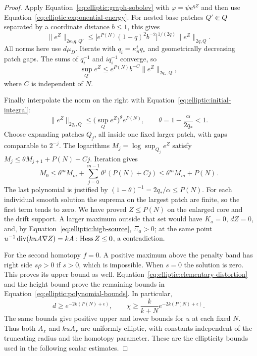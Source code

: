\begin{proof}
Apply Equation~\eqref{eq:elliptic:graph-sobolev} with
$\varphi=\psi e^{qZ}$ and then use
Equation~\eqref{eq:elliptic:exponential-energy}.  For nested base
patches $Q'\Subset Q$ separated by a coordinate distance $b\le1$,
this gives
\[
 \|e^Z\|_{2\kappa_nq,Q'}
 \le\bigl[e^{P(N)}(1+q)^2b^{-2}\bigr]^{1/(2q)}
                          \|e^Z\|_{2q,Q}.
\]
All norms here use $d\mu_D$.  Iterate with
$q_i=\kappa_n^iq_*$ and geometrically decreasing patch gaps.
The sums of $q_i^{-1}$ and $i q_i^{-1}$ converge, so
\begin{equation}\label{eq:elliptic:moser-output}
 \sup_{Q'}e^Z
 \le e^{P(N)}b^{-C}\|e^Z\|_{2q_*,Q},
\end{equation}
where $C$ is independent of $N$.

Finally interpolate the norm on the right with
Equation~\eqref{eq:elliptic:initial-integral}:
\[
 \|e^Z\|_{2q_*,Q}
 \le \bigl(\sup_Qe^Z\bigr)^\theta e^{P(N)},
 \qquad \theta=1-\frac\alpha{2q_*}<1.
\]
Choose expanding patches $Q_j$, all inside one fixed larger patch,
with gaps comparable to $2^{-j}$.  The logarithms $M_j=\log\sup_{Q_j}e^Z$
satisfy $M_j\le\theta M_{j+1}+P(N)+Cj$.
Iteration gives
\[
 M_0\le\theta^mM_m+
          \sum_{j=0}^{m-1}\theta^j(P(N)+Cj)\le\theta^mM_m+P(N).
\]
The last polynomial is justified by
$(1-\theta)^{-1}=2q_*/\alpha\le P(N)$.
For each individual smooth solution the suprema on the largest patch
are finite, so the first term tends to zero.  We have proved
$Z\le P(N)$ on the enlarged core and the drift support.  A larger
maximum outside that set would have $K_a=0$, $dZ=0$, and, by
Equation~\eqref{eq:elliptic:high-source}, $\Xi_a>0$; at the same point
$u^{-1}\operatorname{div}(kuA\nabla Z)=kA:\operatorname{Hess} Z\le0$, a contradiction.

For the second homotopy $f=0$.  A positive maximum above the penalty
band has right side $s\rho>0$ if $s>0$, which is impossible.  When
$s=0$ the solution is zero.  This proves its upper bound as well.
Equation~\eqref{eq:elliptic:elementary-distortion} and the height bound
prove the remaining bounds in
Equation~\eqref{eq:elliptic:polynomial-bounds}.  In particular,
\[
 d\ge e^{-2k(P(N)+\epsilon)},\qquad
 \chi\ge\frac{k}{k+N}e^{-2k(P(N)+\epsilon)}.
\]
The same bounds give positive upper and lower bounds for $u$ at each
fixed $N$.  Thus both $A_\chi$ and $kuA_\chi$ are uniformly elliptic,
with constants independent of the truncating radius and the homotopy
parameter.  These are the ellipticity bounds used in the following
scalar estimates.
\end{proof}

